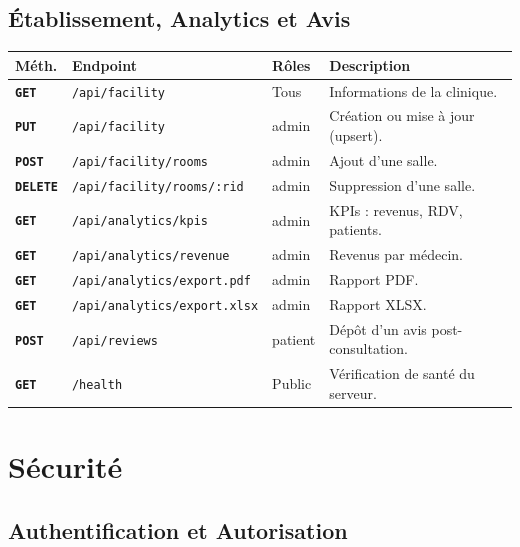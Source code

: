 \documentclass[12pt,a4paper]{report}
\newcommand{\method}[1]{\texttt{\textcolor{MedTealDark}{\bfseries#1}}}
\begin{document}
\section{Établissement, Analytics et Avis}

\begin{center}
\small
\begin{tabular}{@{} l p{4.5cm} p{3.5cm} p{4.5cm} @{}}
  \toprule
  \textbf{Méth.} & \textbf{Endpoint} & \textbf{Rôles} & \textbf{Description} \\
  \midrule
  \method{GET}    & \texttt{/api/facility}          & Tous              & Informations de la clinique. \\
  \method{PUT}    & \texttt{/api/facility}          & admin             & Création ou mise à jour (upsert). \\
  \method{POST}   & \texttt{/api/facility/rooms}    & admin             & Ajout d'une salle. \\
  \method{DELETE} & \texttt{/api/facility/rooms/:rid}& admin            & Suppression d'une salle. \\
  \midrule
  \method{GET}    & \texttt{/api/analytics/kpis}    & admin             & KPIs : revenus, RDV, patients. \\
  \method{GET}    & \texttt{/api/analytics/revenue} & admin             & Revenus par médecin. \\
  \method{GET}    & \texttt{/api/analytics/export.pdf}  & admin         & Rapport PDF. \\
  \method{GET}    & \texttt{/api/analytics/export.xlsx} & admin         & Rapport XLSX. \\
  \midrule
  \method{POST}   & \texttt{/api/reviews}           & patient           & Dépôt d'un avis post-consultation. \\
  \method{GET}    & \texttt{/health}                & Public            & Vérification de santé du serveur. \\
  \bottomrule
\end{tabular}
\end{center}

\chapter{Sécurité}

\section{Authentification et Autorisation}
\end{document}
